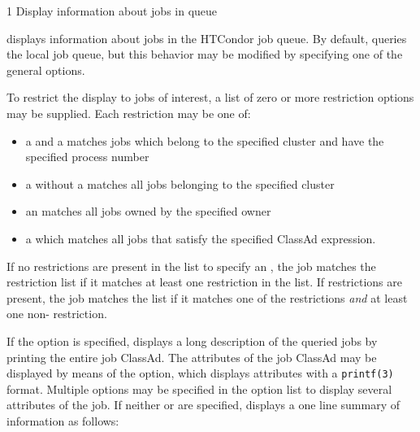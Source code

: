 \begin{ManPage}{\label{man-condor-q}}{1}
{Display information about jobs in queue}


\Synopsis {}

\ToolDebugOption
{}

\Description
{} displays information about jobs in the HTCondor job queue.  By
default,  queries the local job queue,
but this behavior may be 
modified by specifying one of the general options.

To restrict the display to jobs of interest, a list of zero or more 
restriction options may be supplied.  Each restriction may be one of:
\begin{itemize}
	\item a  and a  matches jobs which
		belong to the specified cluster and have the specified process number
	\item a  without a  matches all jobs belonging
		to the specified cluster
	\item an  matches all jobs owned by the specified owner
	\item a  which matches all jobs that
		satisfy the specified ClassAd expression. 
\end{itemize}
If no restrictions are present in the list to specify an
, the job matches the 
restriction list if it matches at least one restriction in the list.  If 
 restrictions are present, the job matches the list if it matches 
one of the  restrictions \emph{and} at least one non- 
restriction.

If the  option is specified,  displays a long description 
of the queried jobs by printing the entire job ClassAd.
The attributes of the job ClassAd may be displayed by means of the
 option, which displays attributes with a \verb+printf(3)+
format.
Multiple  options may be specified in the option list to display
several attributes of the job.
If neither  or  are specified,  displays a 
one line summary of information as follows:


\end{ManPage}
